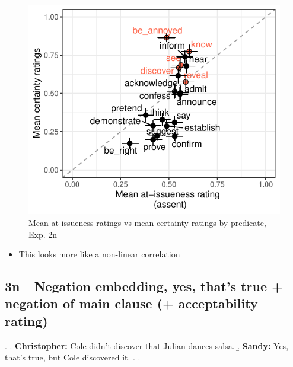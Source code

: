 \documentclass[11pt]{article}
\begin{document}
			\begin{figure}[h]
				\centering
				\includegraphics[]{figures/n2-inv-correl.pdf}
				\caption{Mean at-issueness ratings vs mean certainty ratings by predicate, Exp. 2n}
				\label{fig:figure4}
			\end{figure}


		\begin{itemize}
			\item This looks more like a non-linear correlation
		\end{itemize}

	\subsection{3n---Negation embedding, yes, that's true + negation of main clause (+ acceptability rating)} %
		\ex. \a. \textbf{Christopher:} Cole didn’t discover that Julian dances salsa.
				\b. \textbf{Sandy:} Yes, that’s true, but Cole discovered it.
				\z.
			\z.
\end{document}
